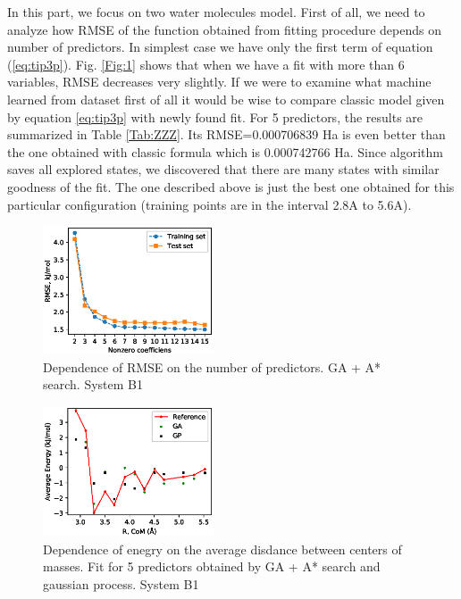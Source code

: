 \documentclass[aps,prl,reprint,amsmath,amssymb,nature]{revtex4-1}
\begin{document}
In this part, we focus on two water molecules model. First of all, we need to analyze how RMSE of the function obtained from fitting procedure depends on number of predictors. In simplest case we have only the first term of equation (\ref{eq:tip3p}). Fig. \ref{Fig:1} shows that when we have a fit with more than 6 variables, RMSE decreases very slightly. If we were to examine what machine learned from dataset first of all it would be wise to compare classic model given by equation \ref{eq:tip3p} with newly found fit. For 5 predictors, the results are summarized in Table \ref{Tab:ZZZ}. Its RMSE=0.000706839 Ha is even better than the one obtained with classic formula which is 0.000742766 Ha. Since algorithm saves all explored states, we discovered that there are many states with similar goodness of the fit. The one described above is just the best one obtained for this particular configuration (training points are in the interval 2.8A to 5.6A).

\begin{figure}
\includegraphics[width=0.45\textwidth]{media/B1_Single_GA_PATH_RMSE.eps}
\caption{Dependence of RMSE on the number of predictors. GA + A* search. System B1}\label{Fig:B1_RMSE}
\end{figure}

\begin{figure}
\includegraphics[width=0.45\textwidth]{media/B1_Single_Energy_5_predictors.eps}
\caption{Dependence of enegry on the average disdance between centers of masses. Fit for 5 predictors obtained by GA + A* search and gaussian process. System B1}\label{Fig:B1_Energy}
\end{figure}
\end{document}
